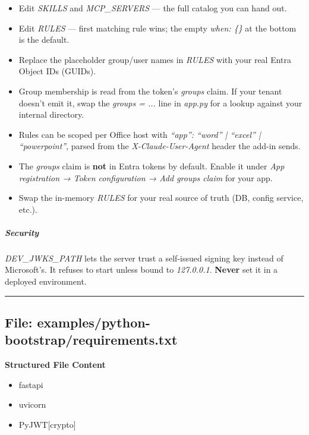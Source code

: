 \documentclass[11pt]{article}
\begin{document}
\begin{itemize}[leftmargin=*,itemsep=2pt,topsep=2pt]
\item {} Edit \emph{SKILLS} and \emph{MCP\_\allowbreak{}SERVERS} — the full catalog you can hand out.
\item {} Edit \emph{RULES} — first matching rule wins; the empty \emph{when: \{\}} at the bottom is the default.
\item {} Replace the placeholder group/user names in \emph{RULES} with your real Entra Object IDs (GUIDs).
\item {} Group membership is read from the token's \emph{groups} claim. If your tenant doesn't emit it, swap the \emph{groups = ...} line in \emph{app.py} for a lookup against your internal directory.
\item {} Rules can be scoped per Office host with \emph{``app'': ``word'' | ``excel'' | ``powerpoint''}, parsed from the \emph{X-Claude-User-Agent} header the add-in sends.
\item {} The \emph{groups} claim is \textbf{not} in Entra tokens by default. Enable it under \emph{App registration → Token configuration → Add groups claim} for your app.
\item {} Swap the in-memory \emph{RULES} for your real source of truth (DB, config service, etc.).
\end{itemize}

\subparagraph{Security}\mbox{}\par

\emph{DEV\_\allowbreak{}JWKS\_\allowbreak{}PATH} lets the server trust a self-issued signing key instead of Microsoft's. It refuses to start unless bound to \emph{127.0.0.1}. \textbf{Never} set it in a deployed environment.


\vspace{0.8em}\hrule\vspace{0.8em}

\subsection{File: examples/python-bootstrap/requirements.txt}\label{file:examples-python-bootstrap-requirements-txt}

\textbf{Structured File Content}
\begin{itemize}[leftmargin=*,itemsep=2pt,topsep=2pt]
\item {} fastapi
\item {} uvicorn
\item {} PyJWT[crypto]
\end{itemize}
\end{document}
